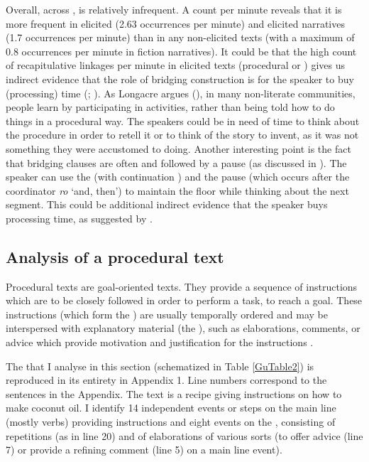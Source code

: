 \documentclass[output=paper]{LSP/langsci}
\begin{document}
Overall, across ,  is relatively infrequent. A count per minute reveals that it is more frequent in elicited  (2.63 occurrences per minute) and elicited narratives (1.7 occurrences per minute) than in any non-elicited texts (with a maximum of 0.8 occurrences per minute in fiction narratives). It could be that the high count of recapitulative linkages per minute in elicited texts (procedural or ) gives us indirect evidence that the role of bridging construction is for the speaker to buy (processing) time (\citealt[][378]{devries.2005}; \citeyear[][817]{devries.2006}). As Longacre argues (\citeyear[][9--10]{longacre83}), in many non-literate communities, people learn by participating in activities, rather than being told how to do things in a procedural way. The speakers could be in need of time to think about the procedure in order to retell it or to think of the story to invent, as it was not something they were accustomed to doing. Another interesting point is the fact that bridging clauses are often  and followed by a pause (as discussed in ). The speaker can use the  (with continuation ) and the pause (which occurs after the coordinator \textit{ro} `and, then') to maintain the floor while thinking about the next segment. This could be additional indirect evidence that the speaker buys processing time, as suggested by \citet[][817]{devries.2006}. 


\subsection{Analysis of a procedural text} 
\label{Gusec:procedural}
Procedural texts are goal-oriented texts. They provide a sequence of instructions which are to be closely followed in order to perform a task, to reach a goal. These instructions (which form the ) are usually temporally ordered and may be interspersed with explanatory material (the ), such as elaborations, comments, or advice which provide motivation and justification for the instructions \citep{adam01,fontan08,delpech08}. 

The  that I analyse in this section (schematized in Table \ref{GuTable2}) is reproduced in its entirety in Appendix 1. Line numbers correspond to the sentences in the Appendix. The text is a recipe giving instructions on how to make coconut oil. I identify 14 independent events or steps on the main line (mostly  verbs) providing instructions and eight events on the , consisting of repetitions (as in line 20) and of elaborations of various sorts (to offer advice (line 7) or provide a refining comment (line 5) on a main line event). 
\end{document}
